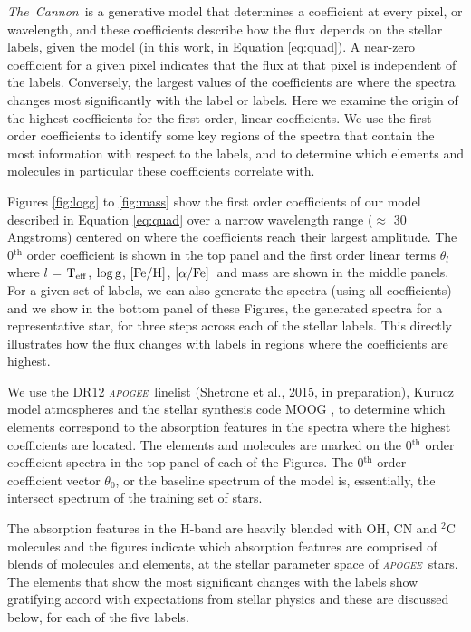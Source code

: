 \documentclass[12pt, preprint]{aastex}
\newcommand{\project}[1]{\textsl{#1}}
\newcommand{\tc}{\project{The~Cannon}}
\newcommand{\apogee}{\project{\textsc{apogee}}}
\newcommand{\teff}{\mbox{$\rm T_{eff}$}}
\newcommand{\feh}{\mbox{$\rm [Fe/H]$}}
\newcommand{\alphafe}{\mbox{$\rm [\alpha/Fe]$}}
\newcommand{\logg}{\mbox{$\rm \log g$}}
\begin{document}
\tc\ is a generative model that determines a coefficient at every pixel, or wavelength, and these coefficients describe how the flux depends on the stellar labels, given the model (in this work, in Equation \ref{eq:quad}).   A near-zero coefficient for a given pixel indicates that the flux at that pixel is independent of the labels. Conversely, the largest values of the coefficients are where the spectra changes most significantly with the label or labels. Here we examine the origin of the highest coefficients for the first order, linear coefficients. We use the first order coefficients to identify some key regions of the spectra that contain the most information with respect to the labels, and to determine which elements and molecules in particular these coefficients correlate with. 

Figures \ref{fig:logg} to \ref{fig:mass} show the first order coefficients of our model described in Equation \ref{eq:quad} over a narrow wavelength range ($\approx$ 30 Angstroms) centered on where the coefficients reach their largest amplitude. The 0$^{\mbox{th}}$ order coefficient is shown in the top panel and the first order linear terms $\theta_l$ where $l$ = \teff, \logg, \feh, \alphafe\ and mass are shown in the middle panels. For a given set of labels, we can also generate the spectra (using all coefficients) and we  show in the bottom panel of these Figures, the generated spectra for a representative star, for three steps across each of the stellar labels. This directly illustrates how the flux changes with labels in regions where the coefficients are highest.  

We use the DR12 \apogee\ linelist (Shetrone et al., 2015, in preparation), Kurucz model atmospheres \citep{castelli2004} and the stellar synthesis code MOOG \citep{sneden1979}, to determine which elements correspond to the absorption features in the spectra where the highest coefficients are located. The elements and molecules are marked on the 0$^{\mbox{th}}$ order coefficient spectra in the top panel of each of the Figures. The 0$^{\mbox{th}}$ order-coefficient vector $\theta_0$, or the baseline spectrum of the model is, essentially, the intersect spectrum of the training set of stars. 

The absorption features in the H-band are heavily blended with OH, CN and $^2$C molecules and the figures indicate which absorption features are comprised of blends of molecules and elements, at the stellar parameter space of \apogee\ stars. The elements that show the most significant changes with the labels show gratifying accord with expectations from stellar physics and these are discussed below, for each of the five labels. 
\end{document}
